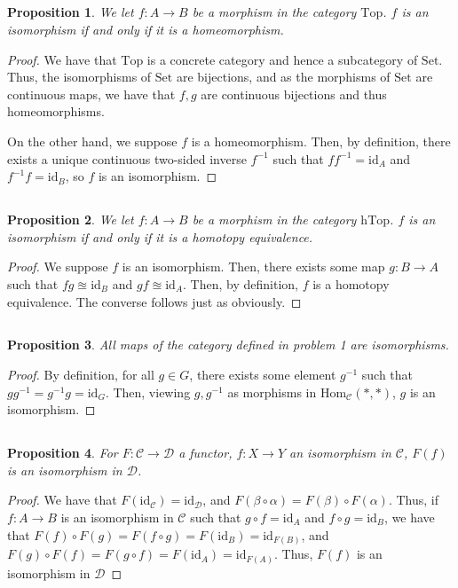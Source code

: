 \documentclass[english]{article}
\newcommand{\prt}[1]{\setcounter{subsection}{#1-1}\subsection{}}
\newtheorem*{proposition*}{Proposition}
\theoremstyle{remark}
\theoremstyle{definition}
\newcommand{\Ccal}{\mathcal{C}}
\newcommand{\Dcal}{\mathcal{D}}
\newcommand{\id}{\mathrm{id}}
\renewcommand{\hom}{\mathrm{Hom}}
\newcommand{\Top}{\mathrm{Top}}
\renewcommand{\top}{\Top}
\newcommand{\hTop}{\mathrm{hTop}}
\newcommand{\set}{\mathrm{Set}}
\begin{document}
\prt{2}\begin{proposition*}
	We let $f:A\to B$ be a morphism in the category $\top$. $f$ is an isomorphism if and only if it is a homeomorphism.
\end{proposition*}
\begin{proof}
	We have that $\top$ is a concrete category and hence a subcategory of $\set$. Thus, the isomorphisms of $\set$ are bijections, and as the morphisms of $\set$ are continuous maps, we have that $f,g$ are continuous bijections and thus homeomorphisms. 
	
	On the other hand, we suppose $f$ is a homeomorphism. Then, by definition, there exists a unique continuous two-sided inverse $f^{-1}$ such that $ff^{-1}=\id_A$ and $f^{-1}f=\id_B$, so $f$ is an isomorphism.
\end{proof}
\prt{3}\begin{proposition*}
	We let $f:A\to B$ be a morphism in the category $\hTop$. $f$ is an isomorphism if and only if it is a homotopy equivalence.
\end{proposition*}
\begin{proof}
	We suppose $f$ is an isomorphism. Then, there exists some map $g:B\to A$ such that $fg\approxeq \id_B$ and $gf\approxeq \id_A$. Then, by definition, $f$ is a homotopy equivalence. The converse follows just as obviously.
\end{proof}
\prt{4}
\begin{proposition*}
	All maps of the category defined in problem 1 are isomorphisms.
\end{proposition*}
\begin{proof}
	By definition, for all $g\in G$, there exists some element $g^{-1}$ such that $gg^{-1}=g^{-1}g=\id_G$. Then, viewing $g,g^{-1}$ as morphisms in $\hom_\Ccal(*,*)$, $g$ is an isomorphism.
\end{proof}
\prt{5}
\begin{proposition*}
	For $F:\Ccal\to\Dcal$ a functor, $f:X\to Y$ an isomorphism in $\Ccal$, $F(f)$ is an isomorphism in $\Dcal$. 
\end{proposition*}
\begin{proof}
	We have that $F(\id_\Ccal)=\id_\Dcal$, and $F(\beta\circ \alpha)=F(\beta)\circ F(\alpha)$. Thus, if $f:A\to B$ is an isomorphism in $\Ccal$ such that $g\circ f=\id_A$ and $f\circ g=\id_B$, we have that $F(f)\circ F(g)=F(f\circ g)=F(\id_B)=\id_{F(B)}$, and  $F(g)\circ F(f)=F(g\circ f)=F(\id_A)=\id_{F(A)}$. Thus, $F(f)$ is an isomorphism in $\Dcal$
\end{proof}
\end{document}

